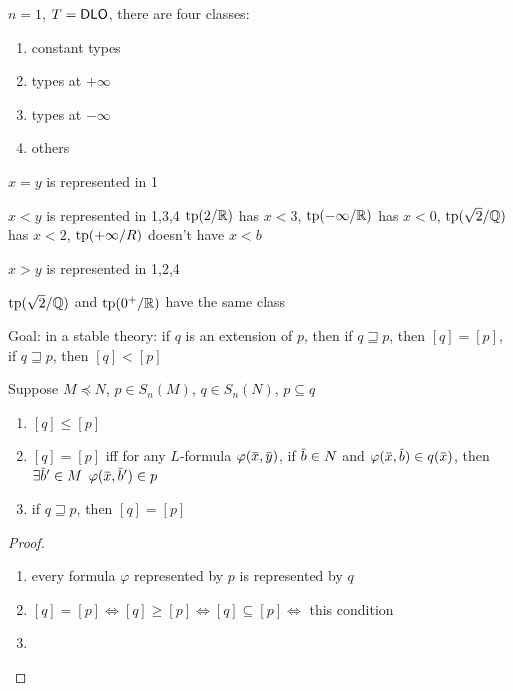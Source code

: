 \documentclass[11pt]{article}
\begin{document}
\begin{examplle}[]
\(n=1\), \(T=\operatorname{\textsf{DLO}}\), there are four classes:
\begin{enumerate}
\item constant types
\item types at \(+\infty\)
\item types at \(-\infty\)
\item others
\end{enumerate}


\begin{center}\end{center}

\(x=y\) is represented in 1

\(x<y\) is represented in 1,3,4 \(\operatorname{tp}(2/\mathbb{R})\) has \(x<3\), \(\operatorname{tp}(-\infty/\mathbb{R})\)
has \(x<0\), \(\operatorname{tp}(\sqrt{2}/\mathbb{Q})\) has \(x<2\), \(\operatorname{tp}(+\infty/R)\) doesn't have \(x<b\)

\(x>y\) is represented in 1,2,4

\(\operatorname{tp}(\sqrt{2}/\mathbb{Q})\) and \(\operatorname{tp}(0^+/\mathbb{R})\) have the same class
\end{examplle}

Goal: in a stable theory: if \(q\) is an extension of \(p\), then if \(q\sqsupseteq p\), then \([q]=[p]\),
if \(q\sqsupseteq p\), then \([q]<[p]\)

\begin{proposition}[]
\label{3.31.5}
Suppose \(M\preceq N\), \(p\in S_n(M)\), \(q\in S_n(N)\), \(p\subseteq q\)
\begin{enumerate}
\item \([q]\le[p]\)
\item \([q]=[p]\) iff for any \(L\)-formula \(\varphi(\barx,\bary)\), if \(\barb\in N\)
and \(\varphi(\barx,\barb)\in q(\barx)\), then \(\exists\barb'\in M\) \(\varphi(\barx,\barb')\in p\)
\item if \(q\sqsupseteq p\), then \([q]=[p]\)
\end{enumerate}
\end{proposition}

\begin{proof}
\begin{enumerate}
\item every formula \(\varphi\) represented by \(p\) is represented by \(q\)
\item \([q]=[p]\Leftrightarrow[q]\ge[p]\Leftrightarrow[q]\subseteq[p]\Leftrightarrow\) this condition
\item 
\end{enumerate}
\end{proof}
\end{document}
